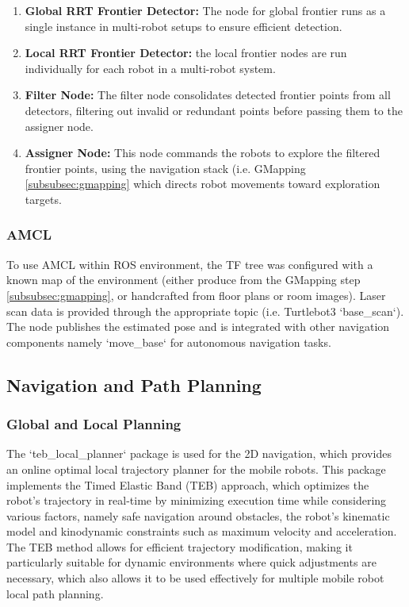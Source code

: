\documentclass[a4paper,twocolumn]{article}
\begin{document}
\begin{enumerate}
    \item \textbf{Global RRT Frontier Detector:} The node for global frontier runs as a single instance in multi-robot setups to ensure efficient detection.
    
    \item \textbf{Local RRT Frontier Detector:} the local frontier nodes are run individually for each robot in a multi-robot system.
    
    \item \textbf{Filter Node:} The filter node consolidates detected frontier points from all detectors, filtering out invalid or redundant points before passing them to the assigner node.
    
    \item \textbf{Assigner Node:} This node commands the robots to explore the filtered frontier points, using the navigation stack (i.e. GMapping \ref{subsubsec:gmapping} which directs robot movements toward exploration targets.
\end{enumerate}


\subsubsection{AMCL}
To use AMCL within ROS environment, the TF tree was configured with a known map of the environment (either produce from the GMapping step \ref{subsubsec:gmapping}, or handcrafted from floor plans or room images). Laser scan data is provided through the appropriate topic (i.e. Turtlebot3 `base\_scan`). The node publishes the estimated pose and is integrated with other navigation components namely `move\_base` for autonomous navigation tasks.

\subsection{Navigation and Path Planning}
\subsubsection{Global and Local Planning}
The `teb\_local\_planner` package is used for the 2D navigation, which provides an online optimal local trajectory planner for the mobile robots\cite{teb_local_planner}. This package implements the Timed Elastic Band (TEB) approach\cite{rosmann2012trajectory}\cite{rosmann2013efficient}\cite{rosmann2015planning}\cite{rosmann2017integrated}, which optimizes the robot's trajectory in real-time by minimizing execution time while considering various factors, namely safe navigation around obstacles, the robot's kinematic model and kinodynamic constraints such as maximum velocity and acceleration. The TEB method allows for efficient trajectory modification, making it particularly suitable for dynamic environments where quick adjustments are necessary, which also allows it to be used effectively for multiple mobile robot local path planning\cite{rosmann2015planning}.
\end{document}
